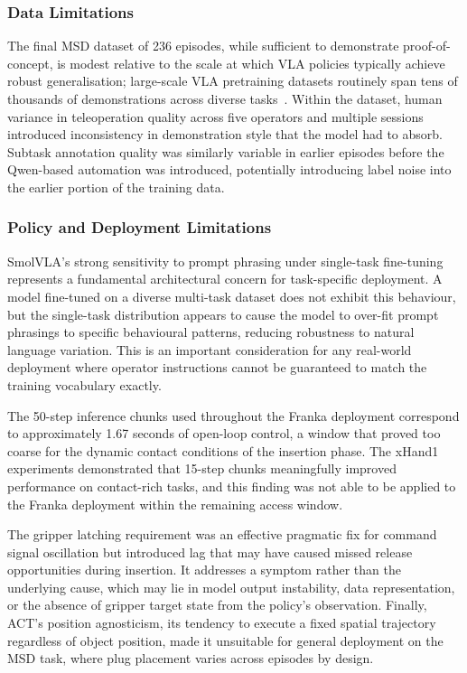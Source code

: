 \documentclass[conference]{IEEEtran}
\begin{document}
\subsubsection{Data Limitations}

The final MSD dataset of 236 episodes, while sufficient to demonstrate proof-of-concept, is modest relative to the scale at which VLA policies typically achieve robust generalisation; large-scale VLA pretraining datasets routinely span tens of thousands of demonstrations across diverse tasks~\cite{brohan2023rt2, black2026pi0visionlanguageactionflowmodel}. Within the dataset, human variance in teleoperation quality across five operators and multiple sessions introduced inconsistency in demonstration style that the model had to absorb. Subtask annotation quality was similarly variable in earlier episodes before the Qwen-based automation was introduced, potentially introducing label noise into the earlier portion of the training data.

\subsubsection{Policy and Deployment Limitations}

SmolVLA's strong sensitivity to prompt phrasing under single-task fine-tuning represents a fundamental architectural concern for task-specific deployment. A model fine-tuned on a diverse multi-task dataset does not exhibit this behaviour, but the single-task distribution appears to cause the model to over-fit prompt phrasings to specific behavioural patterns, reducing robustness to natural language variation. This is an important consideration for any real-world deployment where operator instructions cannot be guaranteed to match the training vocabulary exactly.

The 50-step inference chunks used throughout the Franka deployment correspond to approximately 1.67 seconds of open-loop control, a window that proved too coarse for the dynamic contact conditions of the insertion phase. The xHand1 experiments demonstrated that 15-step chunks meaningfully improved performance on contact-rich tasks, and this finding was not able to be applied to the Franka deployment within the remaining access window.

The gripper latching requirement was an effective pragmatic fix for command signal oscillation but introduced lag that may have caused missed release opportunities during insertion. It addresses a symptom rather than the underlying cause, which may lie in model output instability, data representation, or the absence of gripper target state from the policy's observation. Finally, ACT's position agnosticism, its tendency to execute a fixed spatial trajectory regardless of object position, made it unsuitable for general deployment on the MSD task, where plug placement varies across episodes by design.
\end{document}
